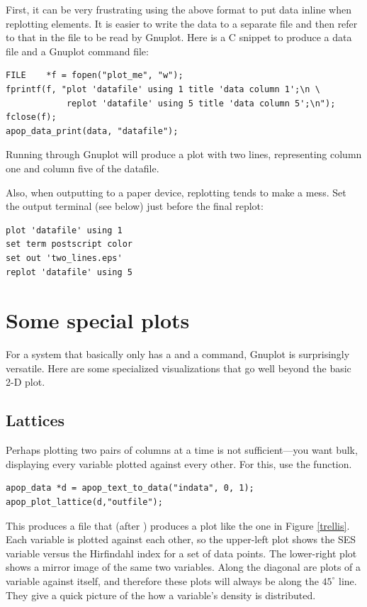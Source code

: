 First, it can be very frustrating using the above  format
to put data inline when replotting elements. It is easier to write the
data to a separate file and then refer to that in the file to be read
by Gnuplot. Here is a C snippet to produce a data file and a Gnuplot
command file:
\begin{lstlisting}
FILE    *f = fopen("plot_me", "w");
fprintf(f, "plot 'datafile' using 1 title 'data column 1';\n \
            replot 'datafile' using 5 title 'data column 5';\n");
fclose(f);
apop_data_print(data, "datafile");
\end{lstlisting}
Running  through Gnuplot will produce a plot with two lines,
representing column one and column five of the datafile.

Also, when outputting to a paper device, replotting tends to make a
mess. Set the output terminal (see below) just before the final replot:
\begin{lstlisting}
plot 'datafile' using 1
set term postscript color
set out 'two_lines.eps'
replot 'datafile' using 5
\end{lstlisting}

\section{Some special plots} For a system that basically only has a 
\ci{set} and a \ci{plot} command, Gnuplot is surprisingly versatile. Here
are some specialized visualizations that go well beyond the basic 2-D
plot.

\subsection{Lattices}  
Perhaps plotting two pairs of columns at a time is not sufficient---you
want bulk, displaying every variable plotted against every other. For
this, use the \ci{apop\_plot\_lattice} function.

\begin{lstlisting}
apop_data *d = apop_text_to_data("indata", 0, 1);
apop_plot_lattice(d,"outfile");
\end{lstlisting}
This produces a file that (after ) produces
a plot like the one in Figure \ref{trellis}. Each variable is plotted
against each other, so the upper-left plot shows the SES variable
versus the Hirfindahl index for a set of data points. The lower-right
plot shows a mirror image of the same two variables. Along the diagonal
are plots of a variable against itself, and therefore these plots will
always be along the $45^\circ$ line. They give a quick picture of the
how a variable's density is distributed.

